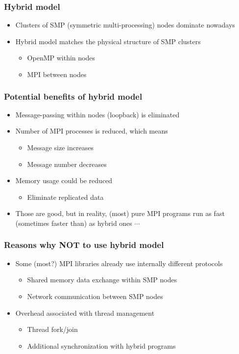 \documentclass[10pt,t]{beamer}
\begin{document}
\begin{frame}
  \frametitle{Hybrid model}
  \begin{itemize}
  \item Clusters of SMP (symmetric multi-processing) nodes dominate nowadays
  \item Hybrid model matches the physical structure of SMP clusters
    \begin{itemize}
    \item OpenMP within nodes
    \item MPI between nodes
    \end{itemize}
    
  \end{itemize}
\end{frame}

\begin{frame}
  \frametitle{Potential benefits of hybrid model}
  \begin{itemize}
  \item Message-passing within nodes (loopback) is eliminated
  \item Number of MPI processes is reduced, which means
    \begin{itemize}
    \item Message size increases
    \item Message number decreases
    \end{itemize}
  \item Memory usage could be reduced
    \begin{itemize}
    \item Eliminate replicated data
    \end{itemize}
  \item Those are good, but in reality, (most) pure MPI programs run as fast (sometimes faster than) as hybrid
    ones $\cdots$
  \end{itemize}
\end{frame}

\begin{frame}
  \frametitle{Reasons why NOT to use hybrid model}
  \begin{itemize}
  \item Some (most?) MPI libraries already use internally different protocols
    \begin{itemize}
    \item Shared memory data exchange within SMP nodes
    \item Network communication between SMP nodes
    \end{itemize}
  \item Overhead associated with thread management
    \begin{itemize}
    \item Thread fork/join
    \item Additional synchronization with hybrid programs 
    \end{itemize}
  \end{itemize}
\end{frame}
\end{document}
